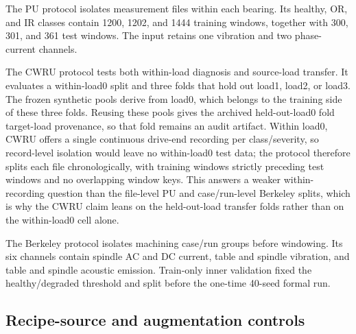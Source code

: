 \documentclass[a4paper,fleqn]{cas-sc}
\begin{document}
The PU protocol isolates measurement files within each bearing. Its healthy,
OR, and IR classes contain 1200, 1202, and 1444 training windows, together with
300, 301, and 361 test windows. The input retains one vibration and two
phase-current channels.

The CWRU protocol tests both within-load diagnosis and source-load transfer. It
evaluates a within-load0 split and three folds that hold out load1, load2, or
load3. The frozen synthetic pools derive from load0, which belongs to the
training side of these three folds. Reusing these pools gives the archived
held-out-load0 fold target-load provenance, so that fold remains an audit
artifact. Within load0, CWRU offers a single continuous drive-end recording per
class/severity, so record-level isolation would leave no within-load0 test
data; the protocol therefore splits each file chronologically, with training
windows strictly preceding test windows and no overlapping window keys. This
answers a weaker within-recording question than the file-level PU and
case/run-level Berkeley splits, which is why the CWRU claim leans on the
held-out-load transfer folds rather than on the within-load0 cell alone.

The Berkeley protocol isolates machining case/run groups before windowing. Its
six channels contain spindle AC and DC current, table and spindle vibration,
and table and spindle acoustic emission. Train-only inner validation fixed the
healthy/degraded threshold and split before the one-time 40-seed formal run.

\subsection{Recipe-source and augmentation controls}
\end{document}
